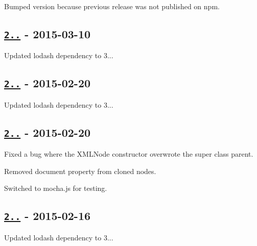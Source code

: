 \begin{DoxyItemize}
\item Bumped version because previous release was not published on npm.
\end{DoxyItemize}

\subsection*{\href{https://github.com/oozcitak/xmlbuilder-js/compare/v2.6.1...v2.6.2}{\tt 2..} -\/ 2015-\/03-\/10}


\begin{DoxyItemize}
\item Updated lodash dependency to 3...
\end{DoxyItemize}

\subsection*{\href{https://github.com/oozcitak/xmlbuilder-js/compare/v2.6.0...v2.6.1}{\tt 2..} -\/ 2015-\/02-\/20}


\begin{DoxyItemize}
\item Updated lodash dependency to 3...
\end{DoxyItemize}

\subsection*{\href{https://github.com/oozcitak/xmlbuilder-js/compare/v2.5.2...v2.6.0}{\tt 2..} -\/ 2015-\/02-\/20}


\begin{DoxyItemize}
\item Fixed a bug where the {\ttfamily X\+M\+L\+Node} constructor overwrote the super class parent.
\item Removed document property from cloned nodes.
\item Switched to mocha.\+js for testing.
\end{DoxyItemize}

\subsection*{\href{https://github.com/oozcitak/xmlbuilder-js/compare/v2.5.1...v2.5.2}{\tt 2..} -\/ 2015-\/02-\/16}


\begin{DoxyItemize}
\item Updated lodash dependency to 3...
\end{DoxyItemize}

